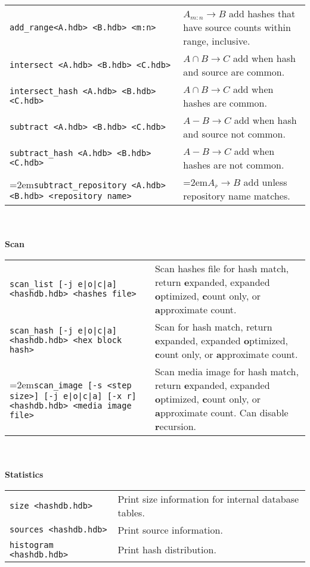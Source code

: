 \begin{footnotesize}
\begin{tabular}{p{3.6 in} p{3.0 in}}
\texttt{add\_range<A.hdb> <B.hdb> <m:n>} & $A_{m:n} \rightarrow B$ add hashes that have source counts within range, inclusive.\\
\texttt{intersect <A.hdb> <B.hdb> <C.hdb>} & $A \cap B \rightarrow C$ add when hash and source are common.\\
\texttt{intersect\_hash <A.hdb> <B.hdb> <C.hdb>} & $A \cap B \rightarrow C$ add when hashes are common.\\
\texttt{subtract <A.hdb> <B.hdb> <C.hdb>} & $A - B \rightarrow C$ add when hash and source not common.\\
\texttt{subtract\_hash <A.hdb> <B.hdb> <C.hdb>} & $A - B \rightarrow C$ add when hashes are not common.\\
\hangindent=2em\texttt{subtract\_repository <A.hdb> <B.hdb> <repository name>} & \hangindent=2em$A_{\overline{r}} \rightarrow B$ add unless repository name matches.\\
\end{tabular}
\\
\\
\textbf{Scan} \\
\begin{tabular}{p{3.6 in} p{3.0 in}}
\texttt{scan\_list [-j e|o|c|a] <hashdb.hdb> <hashes file>} & Scan hashes file for hash match, return \textbf{e}xpanded, expanded \textbf{o}ptimized, \textbf{c}ount only, or \textbf{a}pproximate count.\\
\texttt{scan\_hash [-j e|o|c|a] <hashdb.hdb> <hex block hash>} & Scan for hash match, return \textbf{e}xpanded, expanded \textbf{o}ptimized, \textbf{c}ount only, or \textbf{a}pproximate count.\\
\hangindent=2em\texttt{scan\_image [-s <step size>] [-j e|o|c|a] [-x r] <hashdb.hdb> <media image file>} & Scan media image for hash match, return \textbf{e}xpanded, expanded \textbf{o}ptimized, \textbf{c}ount only, or \textbf{a}pproximate count. Can disable \textbf{r}ecursion.\\
\end{tabular}
\\
\\
\textbf{Statistics}\\
\begin{tabular}{p{3.6 in} p{3.0 in}}
\texttt{size <hashdb.hdb>} & Print size information for internal database tables.\\
\texttt{sources <hashdb.hdb>} & Print source information.\\
\texttt{histogram <hashdb.hdb>} & Print hash distribution.\\

\end{tabular}
\end{footnotesize}
